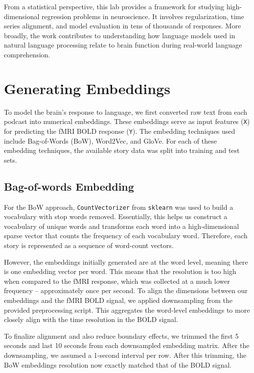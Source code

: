 \documentclass[11pt,letterpaper]{article}
\begin{document}
From a statistical perspective, this lab provides a framework for studying high-dimensional regression problems in neuroscience. It involves regularization, time series alignment, and model evaluation in tens of thousands of responses. More broadly, the work contributes to understanding how language models used in natural language processing relate to brain function during real-world language comprehension.

\vspace{1em} %
\section{Generating Embeddings}
\vspace{0.5em} %
To model the brain's response to language, we first converted raw text from each podcast into numerical embeddings. These embeddings serve as input features (\texttt{X}) for predicting the fMRI BOLD response (\texttt{Y}). The embedding techniques used include Bag-of-Words (BoW), Word2Vec, and GloVe. For each of these embedding techniques, the available story data was split into training and test sets.

\vspace{1em} %
\subsection{Bag-of-words Embedding}
\vspace{0.5em} %
For the BoW approach, \texttt{CountVectorizer} from \texttt{sklearn} was used to build a vocabulary with stop words removed. Essentially, this helps us construct a vocabulary of unique words and transforms each word into a high-dimensional sparse vector that counts the frequency of each vocabulary word. Therefore, each story is represented as a sequence of word-count vectors.

However, the embeddings initially generated are at the word level, meaning there is one embedding vector per word. This means that the resolution is too high when compared to the fMRI response, which was collected at a much lower frequency -- approximately once per second. To align the dimensions between our embeddings and the fMRI BOLD signal, we applied downsampling from the provided preprocessing script. This aggregates the word-level embeddings to more closely align with the time resolution in the BOLD signal.

To finalize alignment and also reduce boundary effects, we trimmed the first 5 seconds and last 10 seconds from each downsampled embedding matrix. After the downsampling, we assumed a 1-second interval per row. After this trimming, the BoW embeddings resolution now exactly matched that of the BOLD signal.
\end{document}
